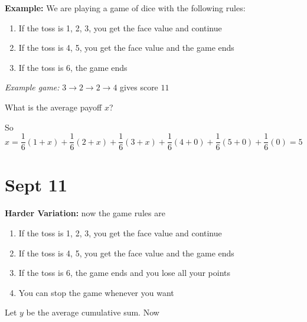 \documentclass[12pt]{article}
\begin{document}
    \textbf{Example:} We are playing a game of dice with the following rules:

    \begin{enumerate}
        \item If the toss is 1, 2, 3, you get the face value and continue 
        \item If the toss is 4, 5, you get the face value and the game ends
        \item If the toss is 6, the game ends 
    \end{enumerate}

    \emph{Example game:} $3 \to 2 \to 2 \to 4$ gives score $11$

    What is the average payoff $x$? 
    \begin{center}
    \end{center}

    So 
    \[x = \frac{1}{6}(1 + x) + \frac{1}{6}(2 + x) + \frac{1}{6}(3 + x) + \frac{1}{6}(4 + 0) + \frac{1}{6}(5 + 0) + \frac{1}{6}(0) = 5\]

\section{Sept 11}
    \textbf{Harder Variation:} now the game rules are 
    \begin{enumerate}
        \item If the toss is 1, 2, 3, you get the face value and continue 
        \item If the toss is 4, 5, you get the face value and the game ends
        \item If the toss is 6, the game ends and you lose all your points
        \item You can stop the game whenever you want 
    \end{enumerate}

    Let $y$ be the average cumulative sum. Now 

    \begin{center}
    \end{center}
\end{document}
